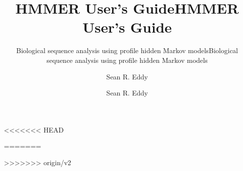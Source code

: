 <<<<<<< HEAD
\title{HMMER User's Guide}

\subtitle{Biological sequence analysis using profile hidden Markov models}

\author{Sean R. Eddy}


=======
\title{HMMER User's Guide}

\subtitle{Biological sequence analysis using profile hidden Markov models}

\author{Sean R. Eddy}


>>>>>>> origin/v2

